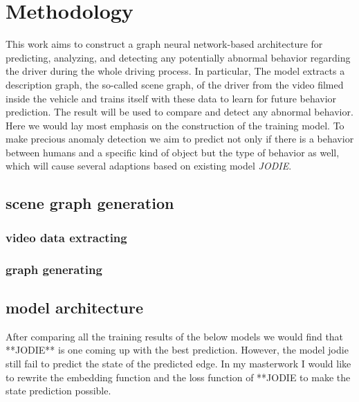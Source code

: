 \chapter{Methodology}\label{chapter:methodology}


This work aims to construct a graph neural network-based architecture for predicting, analyzing, and detecting any potentially abnormal behavior regarding the driver during the whole driving process. In particular, The model extracts a description graph, the so-called scene graph, of the driver from the video filmed inside the vehicle and trains itself with these data to learn for future behavior prediction. The result will be used to compare and detect any abnormal behavior. Here we would lay most emphasis on the construction of the training model. To make precious anomaly detection we aim to predict not only if there is a behavior between humans and a specific kind of object but the type of behavior as well, which will cause several adaptions based on existing model \textit{JODIE}.





\section{scene graph generation}


    \subsection{video data extracting}

    \subsection{graph generating}

\section{model architecture}




After comparing all the training results of the below models we would find that **JODIE** is one coming up with the best prediction. However, the model jodie still fail to predict the state of the predicted edge.
In my masterwork I would like to rewrite the embedding function and the loss function of **JODIE to make the state prediction possible.

